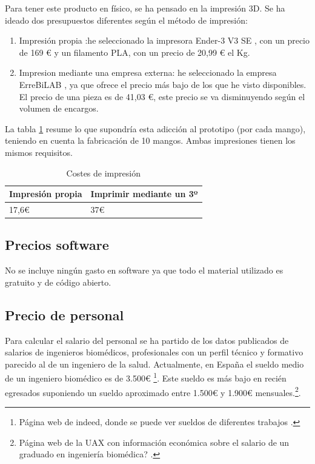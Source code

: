 Para tener este producto en físico, se ha pensado en la impresión 3D. 
Se ha ideado dos presupuestos diferentes según el método de impresión:
\begin{enumerate}
    \item Impresión propia :he seleccionado la impresora Ender-3 V3 SE \cite{Ender-3}, con un precio de 169 € y un filamento PLA\cite{PLA}, con un precio de  20,99 € el Kg. 
    \item Impresion mediante una empresa externa: he seleccionado la empresa ErreBiLAB \cite{ErreBiLAB}, ya que ofrece el precio más bajo de los que he visto disponibles. El precio de una pieza es de 41,03 €, este precio se va disminuyendo según el volumen de encargos. 
\end{enumerate}

La tabla \ref{tab:Impresión} resume lo que supondría esta adicción al prototipo (por cada mango), teniendo en cuenta la fabricación de 10 mangos. 
Ambas impresiones tienen los mismos requisitos.
\begin{table}[h] 
    \centering
    \begin{tabular}{|l|l|}
    \hline
    \rowcolor[HTML]{BFBFBF} 
    \textbf{Impresión propia} & \textbf{Imprimir mediante un 3º} \\ \hline
     17,6€ & 37€  \\ \hline
    \end{tabular}
    \caption{Costes de impresión}
    \label{tab:Impresión}
\end{table}

\subsection{Precios software}
No se incluye ningún gasto en software ya que todo el material utilizado es gratuito y de código abierto.

\subsection{Precio de personal}
Para calcular el salario del personal se ha partido de los datos publicados de salarios de ingenieros biomédicos, profesionales con un perfil técnico y formativo parecido al de un ingeniero de la salud.
Actualmente, en España el sueldo medio de un ingeniero biomédico es de 3.500€ \cite{SueldoBioing}\footnote{Página web de indeed, donde se puede ver sueldos de diferentes trabajos  \cite{SueldoBioing}.}\cite{SUELDO}. Este sueldo es más bajo en recién egresados suponiendo un sueldo aproximado entre 1.500€ y 1.900€ mensuales.\cite{Sueldo_egresado}\footnote{Página web de la UAX con información económica sobre el salario de un graduado en ingeniería biomédica? \cite{Sueldo_egresado}.}.


